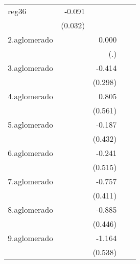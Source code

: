 {\begin{longtable}{l*{4}{D{.}{.}{-1}}}
\addlinespace
reg36       &      -0.091\sym{**} &                     &                     &                     \\
            &     (0.032)         &                     &                     &                     \\
\addlinespace
2.aglomerado&                     &       0.000         &                     &                     \\
            &                     &         (.)         &                     &                     \\
\addlinespace
3.aglomerado&                     &      -0.414         &                     &                     \\
            &                     &     (0.298)         &                     &                     \\
\addlinespace
4.aglomerado&                     &       0.805         &                     &                     \\
            &                     &     (0.561)         &                     &                     \\
\addlinespace
5.aglomerado&                     &      -0.187         &                     &                     \\
            &                     &     (0.432)         &                     &                     \\
\addlinespace
6.aglomerado&                     &      -0.241         &                     &                     \\
            &                     &     (0.515)         &                     &                     \\
\addlinespace
7.aglomerado&                     &      -0.757         &                     &                     \\
            &                     &     (0.411)         &                     &                     \\
\addlinespace
8.aglomerado&                     &      -0.885\sym{*}  &                     &                     \\
            &                     &     (0.446)         &                     &                     \\
\addlinespace
9.aglomerado&                     &      -1.164\sym{*}  &                     &                     \\
            &                     &     (0.538)         &                     &                     \\

\end{longtable}}
